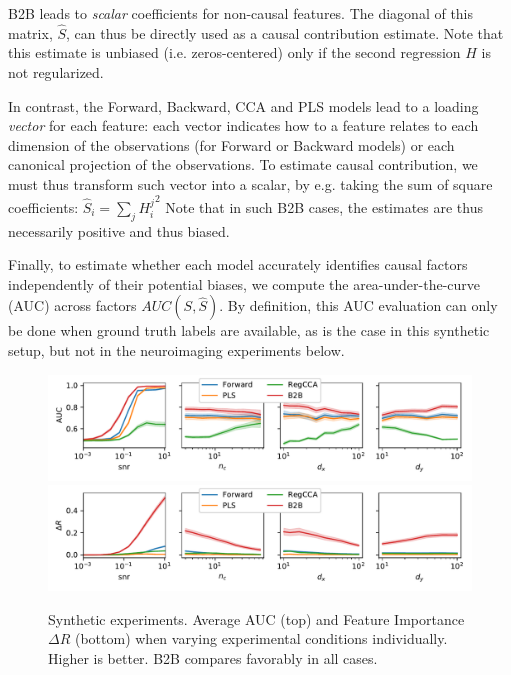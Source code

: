 %
B2B leads to \emph{scalar} coefficients for non-causal
features. The diagonal of this matrix, $\hat S$, can thus be directly used
as a causal contribution estimate. Note that this estimate is unbiased (i.e.
zeros-centered) only if the second regression $H$ is not regularized.

In contrast, the Forward, Backward, CCA and PLS models lead to a
loading \emph{vector} for each feature: each vector indicates how to a feature
relates to each dimension of the observations (for Forward or Backward
models) or each canonical projection of the observations.
To estimate causal contribution, we must thus transform such vector into a
scalar, by e.g. taking the sum of square coefficients:
  $\hat S_i = \sum_j {H^j_i}^2 $
Note that in such B2B cases, the estimates are  thus necessarily positive and thus biased.

Finally, to estimate whether each model accurately identifies causal factors independently of
their potential biases, we compute the
area-under-the-curve (AUC) across factors $AUC(S, \hat S)$.
By definition, this AUC evaluation can only be done when ground truth labels are available, as is the case in
this synthetic setup, but not in the neuroimaging experiments below.

\begin{figure}[t]
  \centering
  \includegraphics[width=\linewidth]{figures/auc_condition.pdf}
  \includegraphics[width=\linewidth]{figures/r_in_condition.pdf}
  \vspace{-4ex}
  \caption{Synthetic experiments. Average AUC (top) and Feature Importance
  $\Delta R$ (bottom) when varying experimental conditions individually.
  Higher is better. B2B compares favorably in all cases.
  \label{fig:percondition}}
\end{figure}


